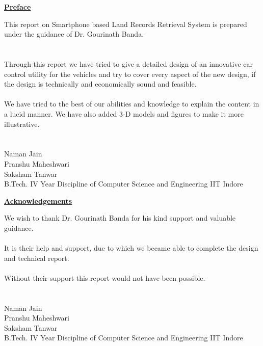 \documentclass[12pt]{article}
\begin{document}
{
    \begin{center}
        \textbf{\underline{\large{Preface}}}
    \end{center}
    This report on Smartphone based Land Records Retrieval System is prepared under the guidance of Dr. Gourinath Banda.\\
    \\
    \\
    Through this report we have tried to give a detailed design of an innovative car control utility for the vehicles and try to cover every aspect of the new design, if the design is technically and economically sound and feasible.\\
    \\
    We have tried to the best of our abilities and knowledge to explain the content in a lucid manner. We have also added 3-D models and figures to make it more illustrative.\\
    \\
    \\
    Naman Jain\\
    Pranshu Maheshwari\\
    Saksham Tanwar\\
    B.Tech. IV Year
    Discipline of Computer Science and Engineering
    IIT Indore 


    \thispagestyle{empty}
}

\clearpage


{
    \begin{center}
        \textbf{\underline{\large{Acknowledgements}}}
    \end{center}
    We wish to thank Dr. Gourinath Banda for his kind support and valuable guidance.\\
    \\
    It is their help and support, due to which we became able to complete the design and technical report.\\
    \\
    Without their support this report would not have been possible.\\
    \\
    \\
    Naman Jain\\
    Pranshu Maheshwari\\
    Saksham Tanwar\\
    B.Tech. IV Year
    Discipline of Computer Science and Engineering
    IIT Indore 
    \thispagestyle{empty}
}
\end{document}
